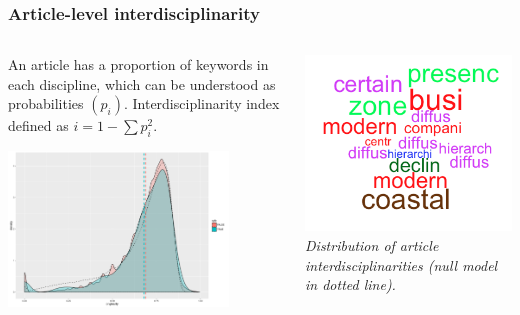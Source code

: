 \begin{frame}
\frametitle{Article-level interdisciplinarity}



\begin{columns}
\begin{column}{0.7\textwidth}
An article has a proportion of keywords in each discipline, which can be understood as probabilities $(p_i)$. Interdisciplinarity index defined as $i = 1 - \sum p_i^2$.

\bigskip

\centering

\includegraphics[width=0.8\textwidth]{figures/firstorderint_withNull}

\end{column}
\begin{column}{0.3\textwidth}
\vspace{-1cm}
\includegraphics[width=\textwidth]{figures/exampleWordcloud_24872}
\vspace{1cm}
\textit{Distribution of article interdisciplinarities (null model in dotted line). }
\end{column}
\end{columns}


\end{frame}
